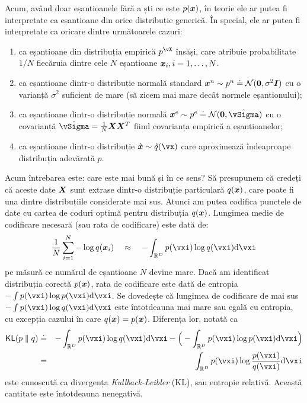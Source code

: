 \documentclass[../../book-main_ro.tex]{subfiles}
\begin{document}
Acum, având doar eșantioanele fără a ști ce este $p(\bm{x})$, în teorie ele ar putea fi interpretate ca eșantioane din orice distribuție generică. În special, ele ar putea fi interpretate ca oricare dintre următoarele cazuri:
\begin{enumerate}
	\item ca eșantioane din distribuția empirică $p^{\vX}$ însăși, care atribuie probabilitate $1/N$ fiecăruia dintre cele $N$ eșantioane $\bm{x}_i, i=1, \ldots, N$.
	\item ca eșantioane dintr-o distribuție normală standard $\bm{x}^n \sim p^{n} \doteq \mathcal{N}(\boldsymbol{0}, \sigma^2 \boldsymbol{I})$ cu o varianță $\sigma^2$ suficient de mare (să zicem mai mare decât normele eșantionului);
	\item ca eșantioane dintr-o distribuție normală $\x^e \sim p^{e} \doteq \mathcal{N}(\boldsymbol{0}, \hat{\vSigma})$ cu o covarianță $\hat{\vSigma} = \frac{1}{N} \X \X^T$ fiind covarianța empirică a eșantioanelor;
	\item ca eșantioane dintr-o distribuție $\hat \x \sim \hat{q}(\vx)$ care aproximează îndeaproape distribuția adevărată $p$.
\end{enumerate}
Acum întrebarea este: care este mai bună și în ce sens? Să presupunem că credeți că aceste date $\bm{X}$ sunt extrase dintr-o distribuție particulară $q(\bm{x})$, care poate fi una dintre distribuțiile considerate mai sus. Atunci am putea codifica punctele de date cu cartea de coduri optimă pentru distribuția $q(\bm{x})$. Lungimea medie de codificare necesară (sau rata de codificare) este dată de:
\begin{equation}
	\frac{1}{N}\sum_{i=1}^N -\log q(\x_i) \quad \approx \quad - \int_{\R^{D}} p(\vxi) \log q(\vxi)\odif{\vxi}
\end{equation}
pe măsură ce numărul de eșantioane $N$ devine mare. Dacă am identificat distribuția corectă $p(\bm{x})$, rata de codificare este dată de entropia $- \int p(\vxi) \log p(\vxi) \odif{\vxi}$. Se dovedește că lungimea de codificare de mai sus $- \int p(\vxi) \log q(\vxi) \odif{\vxi}$ este întotdeauna mai mare sau egală cu entropia, cu excepția cazului în care $q(\bm{x}) = p(\bm{x})$. Diferența lor, notată ca
\begin{eqnarray}
	\KL(p \mmid q) &\doteq& - \int_{\R^{D}} p(\vxi) \log q(\vxi) \odif{\vxi}  - \Big(- \int_{\R^{D}} p(\vxi) \log p(\vxi) \odif{\vxi} \Big)\\
	&=& \int_{\R^{D}} p(\vxi) \log \frac{p(\vxi)}{q(\vxi)} \odif{\vxi}
\end{eqnarray}
este cunoscută ca divergența {\em Kullback-Leibler} (KL), sau entropie relativă. Această cantitate este întotdeauna nenegativă.
\end{document}
